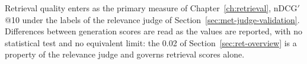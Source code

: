 Retrieval quality enters as the primary measure of Chapter~\ref{ch:retrieval},
nDCG$'$@10 under the labels of the relevance judge of
Section~\ref{sec:met-judge-validation}. Differences between generation scores are read as the
values are reported, with no statistical test and no equivalent limit: the 0.02 of
Section~\ref{sec:ret-overview} is a property of the relevance judge and governs retrieval
scores alone.
